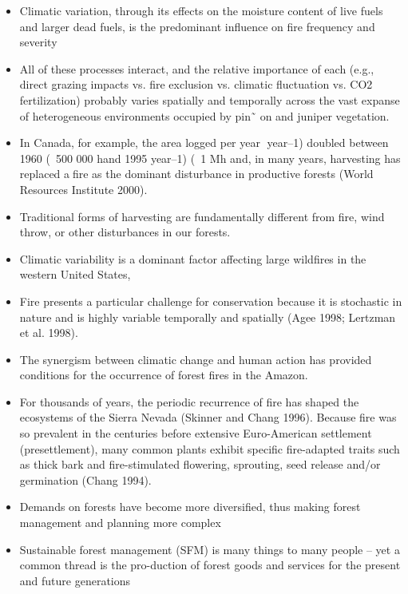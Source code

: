 \documentclass{article}
\begin{document}
\begin{itemize}
    \item Climatic variation, through its effects on the moisture content of live fuels and larger dead fuels, is the predominant influence on fire frequency and severity \cite{schoennagel_interaction_2004}
    \item All of these processes interact, and the relative importance of each (e.g., direct grazing impacts vs. fire exclusion vs. climatic fluctuation vs. CO2 fertilization) probably varies spatially and temporally across the vast expanse of heterogeneous environments occupied by pin˜ on and juniper vegetation. \cite{romme2009historical}  
    \item In Canada, for example, the area logged per year year–1) doubled between 1960 (~500 000 hand 1995 year–1) (~1 Mh and, in many years, harvesting has replaced afire as the dominant disturbance in productive forests (World Resources Institute 2000). \cite{smith_canadas_2000}
    \item Traditional forms of harvesting are fundamentally different from fire, wind throw, or other disturbances in our forests.
    \item Climatic variability is a dominant factor affecting large wildfires in the western United States,\cite{mckenzie_climatic_2004}
    \item Fire presents a particular challenge for conservation because it is stochastic in nature and is highly variable temporally and spatially (Agee 1998; Lertzman et al. 1998). \cite{agee1998landscape} \cite{lertzman1998three}
    \item The synergism between climatic change and human action has provided conditions for the occurrence of forest fires in the Amazon. \cite{da2018dynamics}
    \item For thousands of years, the periodic recurrence of fire has shaped the ecosystems of the Sierra Nevada (Skinner and Chang 1996). Because fire was so prevalent in the centuries before extensive Euro-American settlement (presettlement),
    many common plants exhibit specific fire-adapted traits such as thick bark and fire-stimulated flowering, sprouting, seed release and/or germination (Chang 1994). \cite{mckelvey1996overview} \cite{chang1996ecosystem}
    \item Demands on forests have become more diversified, thus making forest management and planning more complex \cite{eggers2017balancing}
    \item Sustainable forest management (SFM) is many things to many people – yet a common thread is the pro-duction of forest goods and services for the present and future generations \cite{macdicken2015global}

\end{itemize}
\end{document}

